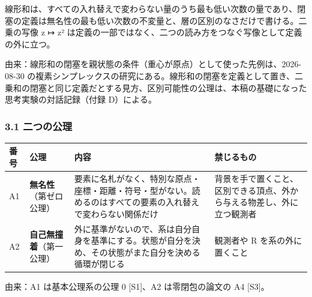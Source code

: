 \documentclass[
  a4paper,
]{ltjsarticle}
\newcounter{none} %
\begin{document}
線形和は、すべての入れ替えで変わらない量のうち最も低い次数の量であり、閉塞の定義は無名性の最も低い次数の不変量と、層の区別のなさだけで書ける。二乗の写像
z ↦ z²
は定義の一部ではなく、二つの読み方をつなぐ写像として定義の外に立つ。

由来：線形和の閉塞を親状態の条件（重心が原点）として使った先例は、2026-08-30
の複素シンプレックスの研究にある。線形和の閉塞を定義として置き、二乗和の閉塞と同じ定義だとする見方、区別可能性の公理は、本稿の基礎になった思考実験の対話記録（付録
D）による。

\subsubsection{3.1 二つの公理}\label{ux4e8cux3064ux306eux516cux7406}

{\def\LTcaptype{none} %
\begin{longtable}[]{@{}
  >{\raggedright\arraybackslash}p{}
  >{\raggedright\arraybackslash}p{}
  >{\raggedright\arraybackslash}p{}
  >{\raggedright\arraybackslash}p{}@{}}
\toprule\noalign{}
\begin{minipage}[b]{\linewidth}\raggedright
番号
\end{minipage} & \begin{minipage}[b]{\linewidth}\raggedright
公理
\end{minipage} & \begin{minipage}[b]{\linewidth}\raggedright
内容
\end{minipage} & \begin{minipage}[b]{\linewidth}\raggedright
禁じるもの
\end{minipage} \\
\midrule\noalign{}
\endhead
\bottomrule\noalign{}
\endlastfoot
A1 & \textbf{無名性}（第ゼロ公理） &
要素に名札がなく、特別な原点・座標・距離・符号・型がない。読めるのはすべての要素の入れ替えで変わらない関係だけ
&
背景を手で置くこと、区別できる頂点、外から与える物差し、外に立つ観測者 \\
A2 & \textbf{自己無撞着}（第一公理） &
外に基準がないので、系は自分自身を基準にする。状態が自分を決め、その状態がまた自分を決める循環が閉じる
& 観測者や R を系の外に置くこと \\
\end{longtable}
}

由来：A1 は基本公理系の公理 0 {[}S1{]}、A2 は零閉包の論文の A4
{[}S3{]}。
\end{document}
